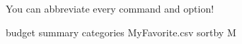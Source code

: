 \documentclass[12pt,letterpaper]{article}
\begin{document}
\Large
    \begin{framed}
\begin{minipage}[t][3in][t]{5in}
    \center
            You can abbreviate every command and option! \\
            \begin{budget}
budget summary categories MyFavorite.csv sortby M
        \end{budget}
\end{minipage}
    \end{framed}
\end{document}
